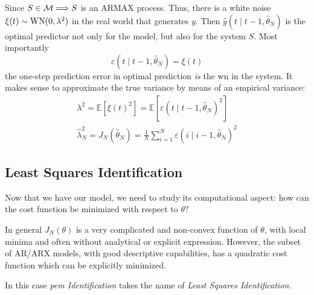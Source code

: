 Since $ S\in \mathcal{M} \Longrightarrow S$ is an ARMAX process. Thus, there is a white noise $ \xi (t) \sim \operatorname{WN}(0,\lambda ^{2})$ in the real world that generates $y$. Then $ \hat{y}(t\mid t-1,\hat{\theta }_{N})$ is the optimal predictor not only for the model, but also for the system $S$. Most importantly
\begin{equation*}
\varepsilon (t\mid t-1,\hat{\theta }_{N}) =\xi (t)
\end{equation*}
the one-step prediction error in optimal prediction \textit{is} the \gls{wn} in the system. It makes sense to approximate the true variance by means of an empirical variance:
\begin{gather*}
\lambda ^{2} =\mathbb{E}\left[ \xi (t)^{2}\right] =\mathbb{E}[ \varepsilon (t\mid t-1,\hat{\theta }_{N})^2]\\
\hat{\lambda }_{N}^{2} =J_{N}(\hat{\theta }_{N}) =\frac{1}{N}\sum _{i=1}^{N} \varepsilon (i\mid i-1,\hat{\theta }_{N})^{2}
\end{gather*}

\subsection{Least Squares Identification}
Now that we have our model, we need to study its computational aspect: how can the cost function be minimized with respect to $ \theta ?$

In general $ J_{N}(\theta)$ is a very complicated and non-convex function of $ \theta $, with local minima and often without analytical or explicit expression. However, the subset of AR/ARX models, with good descriptive capabilities, has a quadratic cost function which can be explicitly minimized.

In this case \textit{\gls{pem} Identification} takes the name of \textit{Least Squares Identification.}


